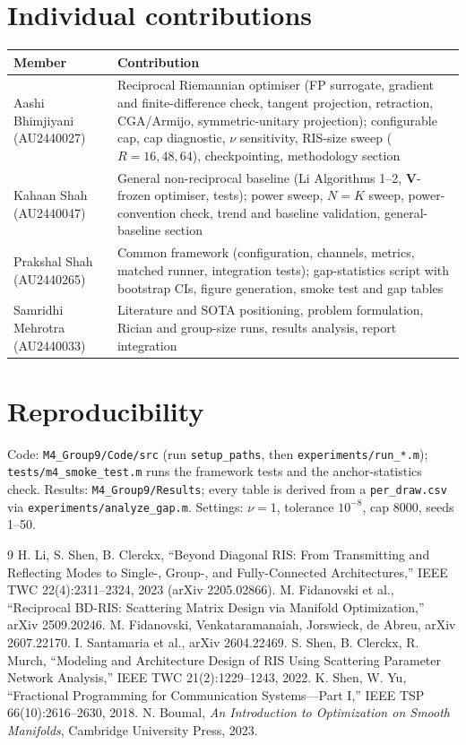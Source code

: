 \documentclass[10pt,a4paper]{article}
\newcommand{\file}[1]{\texttt{\small #1}}
\begin{document}
\section{Individual contributions}
\begin{center}\small
\begin{tabularx}{\textwidth}{@{}lX@{}}\toprule
Member & Contribution\\\midrule
Aashi Bhimjiyani (AU2440027) & Reciprocal Riemannian optimiser (FP surrogate, gradient and finite-difference check, tangent projection, retraction, CGA/Armijo, symmetric-unitary projection); configurable cap, cap diagnostic, $\nu$ sensitivity, RIS-size sweep ($R=16,48,64$), checkpointing, methodology section\\
Kahaan Shah (AU2440047) & General non-reciprocal baseline (Li Algorithms 1--2, $\mathbf V$-frozen optimiser, tests); power sweep, $N{=}K$ sweep, power-convention check, trend and baseline validation, general-baseline section\\
Prakshal Shah (AU2440265) & Common framework (configuration, channels, metrics, matched runner, integration tests); gap-statistics script with bootstrap CIs, figure generation, smoke test and gap tables\\
Samridhi Mehrotra (AU2440033) & Literature and SOTA positioning, problem formulation, Rician and group-size runs, results analysis, report integration\\\bottomrule
\end{tabularx}
\end{center}

\section{Reproducibility}
Code: \file{M4\_Group9/Code/src} (run \file{setup\_paths}, then \file{experiments/run\_*.m}); \file{tests/m4\_smoke\_test.m} runs the framework tests and the anchor-statistics check. Results: \file{M4\_Group9/Results}; every table is derived from a \file{per\_draw.csv} via \file{experiments/analyze\_gap.m}. Settings: $\nu=1$, tolerance $10^{-8}$, cap 8000, seeds 1--50.

\begin{thebibliography}{9}\small
{} H. Li, S. Shen, B. Clerckx, ``Beyond Diagonal RIS: From Transmitting and Reflecting Modes to Single-, Group-, and Fully-Connected Architectures,'' IEEE TWC 22(4):2311--2324, 2023 (arXiv 2205.02866).
 M. Fidanovski et al., ``Reciprocal BD-RIS: Scattering Matrix Design via Manifold Optimization,'' arXiv 2509.20246.
 M. Fidanovski, Venkataramanaiah, Jorswieck, de Abreu, arXiv 2607.22170.
 I. Santamaria et al., arXiv 2604.22469.
 S. Shen, B. Clerckx, R. Murch, ``Modeling and Architecture Design of RIS Using Scattering Parameter Network Analysis,'' IEEE TWC 21(2):1229--1243, 2022.
 K. Shen, W. Yu, ``Fractional Programming for Communication Systems---Part I,'' IEEE TSP 66(10):2616--2630, 2018.
 N. Boumal, \emph{An Introduction to Optimization on Smooth Manifolds}, Cambridge University Press, 2023.
\end{thebibliography}
\end{document}
